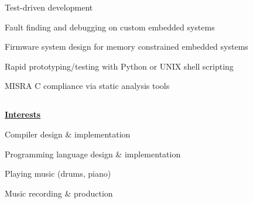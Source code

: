 \documentclass[6pt]{article}
\begin{document}
\begin{minipage}{13em}
\noindent
\begin{itemize}
{\small \raggedright
    \item Test-driven development
    \item Fault finding and debugging on custom embedded systems
    \item Firmware system design for memory constrained embedded systems
    \item Rapid prototyping/testing with Python or UNIX shell scripting
    \item MISRA C compliance via static analysis tools
}
\end{itemize}

\subsection*{}
{\underline{\textbf{Interests}}}

\noindent
\begin{itemize}
{\small \raggedright
    \item Compiler design \& implementation
    \item Programming language design \& implementation
    \item Playing music (drums, piano)
    \item Music recording \& production
}
\end{itemize}
\end{minipage}
\hspace*{2em}
%
\end{document}

